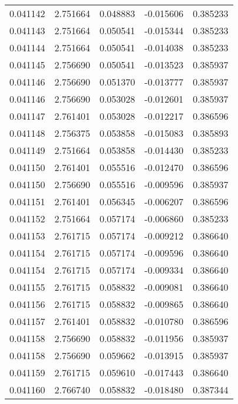\begin{tabular}{lrrrr}
0.041142    &  2.751664 &  0.048883 & -0.015606 &             0.385233 \\
0.041143    &  2.751664 &  0.050541 & -0.015344 &             0.385233 \\
0.041144    &  2.751664 &  0.050541 & -0.014038 &             0.385233 \\
0.041145    &  2.756690 &  0.050541 & -0.013523 &             0.385937 \\
0.041146    &  2.756690 &  0.051370 & -0.013777 &             0.385937 \\
0.041146    &  2.756690 &  0.053028 & -0.012601 &             0.385937 \\
0.041147    &  2.761401 &  0.053028 & -0.012217 &             0.386596 \\
0.041148    &  2.756375 &  0.053858 & -0.015083 &             0.385893 \\
0.041149    &  2.751664 &  0.053858 & -0.014430 &             0.385233 \\
0.041150    &  2.761401 &  0.055516 & -0.012470 &             0.386596 \\
0.041150    &  2.756690 &  0.055516 & -0.009596 &             0.385937 \\
0.041151    &  2.761401 &  0.056345 & -0.006207 &             0.386596 \\
0.041152    &  2.751664 &  0.057174 & -0.006860 &             0.385233 \\
0.041153    &  2.761715 &  0.057174 & -0.009212 &             0.386640 \\
0.041154    &  2.761715 &  0.057174 & -0.009596 &             0.386640 \\
0.041154    &  2.761715 &  0.057174 & -0.009334 &             0.386640 \\
0.041155    &  2.761715 &  0.058832 & -0.009081 &             0.386640 \\
0.041156    &  2.761715 &  0.058832 & -0.009865 &             0.386640 \\
0.041157    &  2.761401 &  0.058832 & -0.010780 &             0.386596 \\
0.041158    &  2.756690 &  0.058832 & -0.011956 &             0.385937 \\
0.041158    &  2.756690 &  0.059662 & -0.013915 &             0.385937 \\
0.041159    &  2.761715 &  0.059610 & -0.017443 &             0.386640 \\
0.041160    &  2.766740 &  0.058832 & -0.018480 &             0.387344 \\

\end{tabular}
